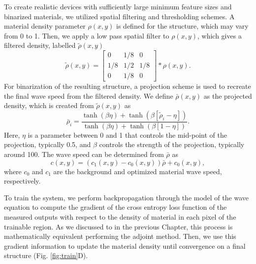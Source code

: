 To create realistic devices with sufficiently large minimum feature sizes and binarized materials, we utilized spatial filtering and thresholding schemes.  A material density parameter $\rho(x,y)$ is defined for the structure, which may vary from 0 to 1.  Then, we apply a low pass spatial filter to $\rho(x,y)$, which gives a filtered density, labelled $\tilde{\rho}(x,y)$
%
\begin{equation}
\tilde{\rho}(x,y) = 
\begin{bmatrix}
0 & 1/8 & 0 \\
1/8 & 1/2 & 1/8 \\
0 & 1/8 & 0
\end{bmatrix}
*
\rho(x,y).
\end{equation}
For binarization of the resulting structure, a projection scheme is used to recreate the final wave speed from the filtered density.  We define $\bar{\rho}(x,y)$ as the projected density, which is created from $\tilde{\rho}(x,y)$ as
\begin{equation}
\bar{\rho}_i = \frac{\tanh{\left( \beta \eta \right)} + \tanh{\left( \beta \left[ \tilde{\rho}_i - \eta \right] \right)}}{\tanh{\left( \beta \eta  \right)} + \tanh{\left( \beta \left[ 1 - \eta \right] \right)}}.
\end{equation}
Here, $\eta$ is a parameter between 0 and 1 that controls the mid-point of the projection, typically 0.5, and $\beta$ controls the strength of the projection, typically around 100.  The wave speed can be determined from $\bar{\rho}$ as
\begin{equation}
c(x,y) = (c_1(x,y) - c_0(x,y))\bar{\rho} + c_0(x,y),
\end{equation}
where $c_0$ and $c_1$ are the background and optimized material wave speed, respectively.

%

To train the system, we perform backpropagation through the model of the wave equation to compute the gradient of the cross entropy loss function of the measured outputs with respect to the density of material in each pixel of the trainable region.
As we discussed to in the previous Chapter, this process is mathematically equivalent performing the adjoint method.
Then, we use this gradient information to update the material density until convergence on a final structure (Fig. \ref{fig:train}D).

